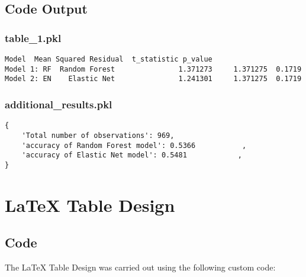 \documentclass[11pt]{article}
\begin{document}
\subsection{Code Output}

\subsubsection*{table\_1.pkl}

\begin{Verbatim}[tabsize=4]
                     Model  Mean Squared Residual  t_statistic p_value
Model 1: RF  Random Forest               1.371273     1.371275  0.1719
Model 2: EN    Elastic Net               1.241301     1.371275  0.1719
\end{Verbatim}

\subsubsection*{additional\_results.pkl}

\begin{Verbatim}[tabsize=4]
{
    'Total number of observations': 969,
    'accuracy of Random Forest model': 0.5366           ,
    'accuracy of Elastic Net model': 0.5481            ,
}
\end{Verbatim}

\section{LaTeX Table Design}
\subsection{{Code}}
The LaTeX Table Design was carried out using the following custom code:
\end{document}
